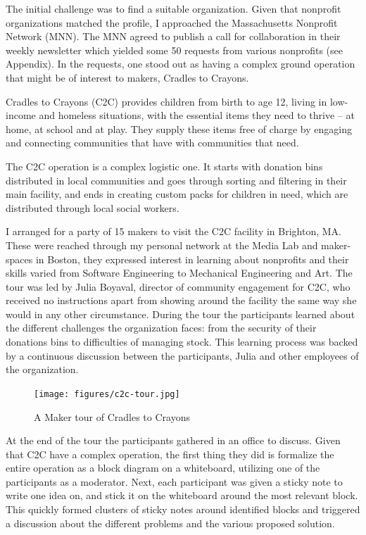 The initial challenge was to find a suitable organization. Given that nonprofit organizations matched the profile, I approached the Massachusetts Nonprofit Network (MNN). The MNN agreed to publish a call for collaboration in their weekly newsletter which yielded some 50 requests from various nonprofits (see Appendix). In the requests, one stood out as having a complex ground operation that might be of interest to makers, Cradles to Crayons.   

Cradles to Crayons (C2C) provides children from birth to age 12, living in low-income and homeless situations, with the essential items they need to thrive – at home, at school and at play. They supply these items free of charge by engaging and connecting communities that have with communities that need.

The C2C operation is a complex logistic one. It starts with donation bins distributed in local communities and goes through sorting and filtering in their main facility, and ends in creating custom packs for children in need, which are distributed through local social workers. 

I arranged for a party of 15 makers to visit the C2C facility in Brighton, MA. These were reached through my personal network at the Media Lab and maker-spaces in Boston, they expressed interest in learning about nonprofits and their skills varied from Software Engineering to Mechanical Engineering and Art. The tour was led by Julia Boyaval, director of community engagement for C2C, who received no instructions apart from showing around the facility the same way she would in any other circumstance. During the tour the participants learned about the different challenges the organization faces: from the security of their donations bins to difficulties of managing stock. This learning process was backed by a continuous discussion between the participants, Julia and other employees of the organization. 

   \begin{figure}[thpb]
      \centering
      \texttt{[image: figures/c2c-tour.jpg]}
      \caption{A Maker tour of Cradles to Crayons}
      \label{fig_setc_class}
   \end{figure}

At the end of the tour the participants gathered in an office to discuss. Given that C2C have a complex operation, the first thing they did is formalize the entire operation as a block diagram on a whiteboard, utilizing one of the participants as a moderator. Next, each participant was given a sticky note to write one idea on, and stick it on the whiteboard around the most relevant block. This quickly formed clusters of sticky notes around identified blocks and triggered a discussion about the different problems and the various proposed solution. 


